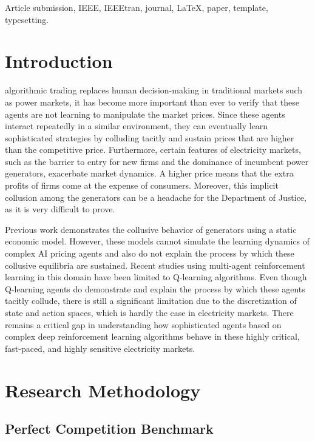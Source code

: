 \documentclass[lettersize,journal]{IEEEtran}
\begin{document}
\begin{IEEEkeywords}
Article submission, IEEE, IEEEtran, journal, \LaTeX, paper, template, typesetting.
\end{IEEEkeywords}

\section{Introduction}
 algorithmic trading replaces human decision-making in traditional markets such as power markets, it has become more important than ever to verify that these agents are not learning to manipulate the market prices. Since these agents interact repeatedly in a similar environment, they can eventually learn sophisticated strategies by colluding tacitly and sustain prices that are higher than the competitive price. Furthermore, certain features of electricity markets, such as the barrier to entry for new firms and the dominance of incumbent power generators, exacerbate market dynamics. A higher price means that the extra profits of firms come at the expense of consumers. Moreover, this implicit collusion among the generators can be a headache for the Department of Justice, as it is very difficult to prove.

Previous work demonstrates the collusive behavior of generators using a static economic model. However, these models cannot simulate the learning dynamics of complex AI pricing agents and also do not explain the process by which these collusive equilibria are sustained. Recent studies using multi-agent reinforcement learning in this domain have been limited to Q-learning algorithms. Even though Q-learning agents do demonstrate and explain the process by which these agents tacitly collude, there is still a significant limitation due to the discretization of state and action spaces, which is hardly the case in electricity markets. There remains a critical gap in understanding how sophisticated agents based on complex deep reinforcement learning algorithms behave in these highly critical, fast-paced, and highly sensitive electricity markets.

\section{Research Methodology}

\subsection{Perfect Competition Benchmark}
\end{document}
